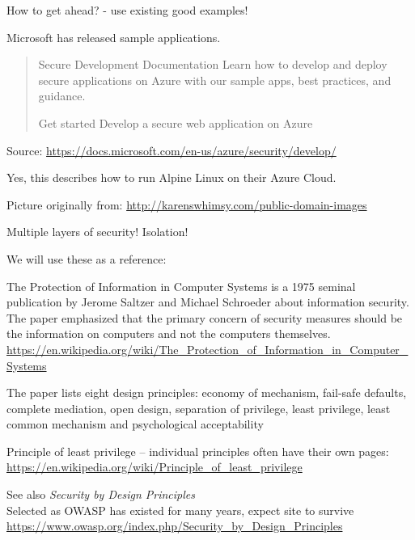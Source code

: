 \documentclass[Screen16to9,17pt]{foils}
\begin{document}
How to get ahead? - use existing good examples!

Microsoft has released sample applications.

\begin{quote}
Secure Development Documentation
Learn how to develop and deploy secure applications on Azure with our sample apps, best practices, and guidance.

Get started
Develop a secure web application on Azure
\end{quote}

Source:
\url{https://docs.microsoft.com/en-us/azure/security/develop/}

Yes, this describes how to run Alpine Linux on their Azure Cloud.



\centerline{Picture originally from: \url{http://karenswhimsy.com/public-domain-images}}




\centerline{\hlkbig\color{security6blue} Multiple layers of security! Isolation!}




We will use these as a reference:
\begin{list2}
\item The Protection of Information in Computer Systems is a 1975 seminal publication by Jerome Saltzer and Michael Schroeder about information security. The paper emphasized that the primary concern of security measures should be the information on computers and not the computers themselves.\\
\url{https://en.wikipedia.org/wiki/The_Protection_of_Information_in_Computer_Systems}
\item The paper lists eight design principles: economy of mechanism, fail-safe defaults, complete mediation, open design, separation of privilege, least privilege, least common mechanism and psychological acceptability
\item Principle of least privilege -- individual principles often have their own pages:\\
\url{https://en.wikipedia.org/wiki/Principle_of_least_privilege}
\item See also \emph{Security by Design Principles}\\
Selected as OWASP has existed for many years, expect site to survive\\
\url{https://www.owasp.org/index.php/Security_by_Design_Principles}
\end{list2}
\end{document}
